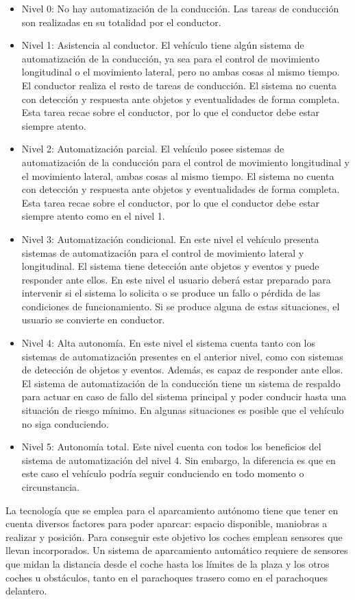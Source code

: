 \begin{itemize}
\item Nivel 0: No hay automatización de la conducción. Las tareas de conducción son realizadas en su totalidad por el conductor.
\item Nivel 1: Asistencia al conductor. El vehículo tiene algún sistema de automatización de la conducción, ya sea para el control de movimiento longitudinal o el movimiento lateral, pero no ambas cosas al mismo tiempo. El conductor realiza el resto de tareas de conducción. El sistema no cuenta con detección y respuesta ante objetos y eventualidades de forma completa. Esta tarea recae sobre el conductor, por lo que el conductor debe estar siempre atento.
\item Nivel 2: Automatización parcial. El vehículo posee sistemas de automatización de la conducción para el control de movimiento longitudinal y el movimiento lateral, ambas cosas al mismo tiempo. El sistema no cuenta con detección y respuesta ante objetos y eventualidades de forma completa. Esta tarea recae sobre el conductor, por lo que el conductor debe estar siempre atento como en el nivel 1.
\item Nivel 3: Automatización condicional. En este nivel el vehículo presenta sistemas de automatización para el control de movimiento lateral y longitudinal. El sistema tiene detección ante objetos y eventos y puede responder ante ellos. En este nivel el usuario deberá estar preparado para intervenir si el sistema lo solicita o se produce un fallo o pérdida de las condiciones de funcionamiento. Si se produce alguna de estas situaciones, el usuario se convierte en conductor.
\item Nivel 4: Alta autonomía. En este nivel el sistema cuenta tanto con los sistemas de automatización presentes en el anterior nivel, como con sistemas de detección de objetos y eventos. Además, es capaz de responder ante ellos. El sistema de automatización de la conducción tiene un sistema de respaldo para actuar en caso de fallo del sistema principal y poder conducir hasta una situación de riesgo mínimo. En algunas situaciones es posible que el vehículo no siga conduciendo.
\item Nivel 5: Autonomía total. Este nivel cuenta con todos los beneficios del sistema de automatización del nivel 4. Sin embargo, la diferencia es que en este caso el vehículo podría seguir conduciendo en todo momento o circunstancia.
\end{itemize}

La tecnología que se emplea para el aparcamiento autónomo tiene que tener en cuenta diversos factores para poder aparcar: espacio disponible, maniobras a realizar y posición. Para conseguir este objetivo los coches emplean sensores que llevan incorporados. Un sistema de aparcamiento automático requiere de sensores que midan la distancia desde el coche hasta los límites de la plaza y los otros coches u obstáculos, tanto en el parachoques trasero como en el parachoques delantero.\\

